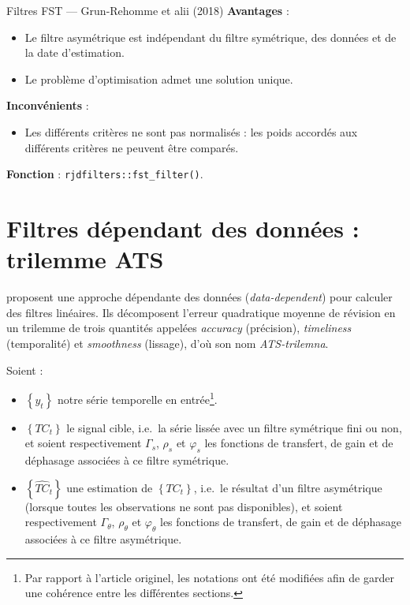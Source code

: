 \documentclass[
  12pt,
  french,
  12pt,a4paper]{article}
\providecommand{\tightlist}{%
  \setlength{\itemsep}{0pt}\setlength{\parskip}{0pt}}
\newcommand\1{\mathds{1}}
\begin{document}
\begin{summary_box}{Filtres FST --- Grun-Rehomme et alii (2018)}
\textbf{Avantages} :

\begin{itemize}
\item
  Le filtre asymétrique est indépendant du filtre symétrique, des données et de la date d'estimation.
\item
  Le problème d'optimisation admet une solution unique.
\end{itemize}

\textbf{Inconvénients} :

\begin{itemize}
\tightlist
\item
  Les différents critères ne sont pas normalisés : les poids accordés aux différents critères ne peuvent être comparés.
\end{itemize}

\textbf{Fonction } : \texttt{rjdfilters::fst\_filter()}.

\end{summary_box}

\hypertarget{sec-WildiMcLeroy}{%
\section{Filtres dépendant des données : trilemme ATS}\label{sec-WildiMcLeroy}}

\textcite{trilemmaWMR2019} proposent une approche dépendante des données (\emph{data-dependent}) pour calculer des filtres linéaires.
Ils décomposent l'erreur quadratique moyenne de révision en un trilemme de trois quantités appelées \emph{accuracy} (précision), \emph{timeliness} (temporalité) et \emph{smoothness} (lissage), d'où son nom \emph{ATS-trilemna}.

Soient :

\begin{itemize}
\item
  \(\left\{ y_{t}\right\}\) notre série temporelle en entrée\footnote{
    Par rapport à l'article originel, les notations ont été modifiées afin de garder une cohérence entre les différentes sections.}.
\item
  \(\left\{TC_{t}\right\}\) le signal cible, i.e.~la série lissée avec un filtre symétrique fini ou non, et soient respectivement \(\Gamma_s\), \(\rho_s\) et \(\varphi_s\) les fonctions de transfert, de gain et de déphasage associées à ce filtre symétrique.
\item
  \(\left\{\widehat{TC}_{t}\right\}\) une estimation de \(\left\{TC_{t}\right\}\), i.e.~le résultat d'un filtre asymétrique (lorsque toutes les observations ne sont pas disponibles), et soient respectivement \(\Gamma_\theta\), \(\rho_\theta\) et \(\varphi_\theta\) les fonctions de transfert, de gain et de déphasage associées à ce filtre asymétrique.
\end{itemize}
\end{document}
